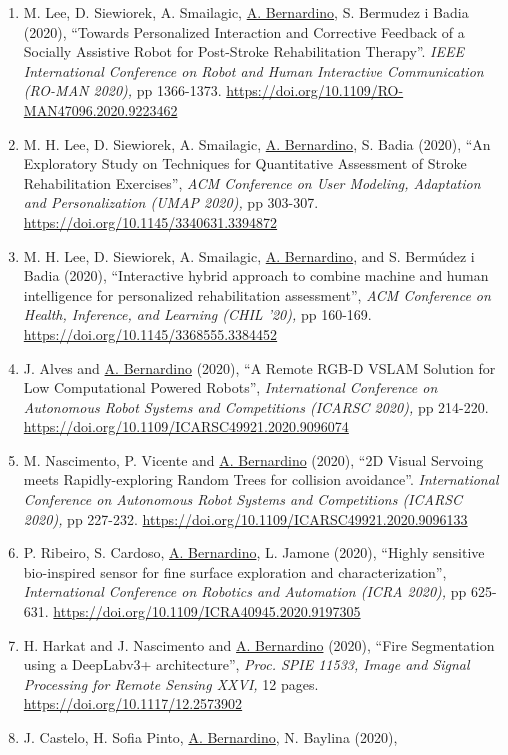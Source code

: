 \begin{enumerate}
\item
  M. Lee, D. Siewiorek, A. Smailagic, \ul{A. Bernardino}, S. Bermudez i
  Badia (2020), ``Towards Personalized Interaction and Corrective
  Feedback of a Socially Assistive Robot for Post-Stroke Rehabilitation
  Therapy''. \emph{IEEE International Conference on Robot and Human
  Interactive Communication (RO-MAN 2020),} pp 1366-1373.
  \url{https://doi.org/10.1109/RO-MAN47096.2020.9223462}~
\item
  M. H. Lee, D. Siewiorek, A. Smailagic, \ul{A. Bernardino}, S. Badia
  (2020), ``An Exploratory Study on Techniques for Quantitative
  Assessment of Stroke Rehabilitation Exercises'', \emph{ACM Conference
  on User Modeling, Adaptation and Personalization (UMAP 2020),} pp
  303-307. \url{https://doi.org/10.1145/3340631.3394872}~
\item
  M. H. Lee, D. Siewiorek, A. Smailagic, \ul{A. Bernardino}, and S.
  Bermúdez i Badia (2020), ``Interactive hybrid approach to combine
  machine and human intelligence for personalized rehabilitation
  assessment'', \emph{ACM Conference on Health, Inference, and Learning
  (CHIL '20),} pp 160-169.
  \url{https://doi.org/10.1145/3368555.3384452}~
\item
  J. Alves and \ul{A. Bernardino} (2020), ``A Remote RGB-D VSLAM
  Solution for Low Computational Powered Robots'', \emph{International
  Conference on Autonomous Robot Systems and Competitions (ICARSC
  2020),} pp 214-220.
  \url{https://doi.org/10.1109/ICARSC49921.2020.9096074}~
\item
  M. Nascimento, P. Vicente and \ul{A. Bernardino} (2020), ``2D Visual
  Servoing meets Rapidly-exploring Random Trees for collision
  avoidance''. \emph{International Conference on Autonomous Robot
  Systems and Competitions (ICARSC 2020),} pp 227-232.
  \url{https://doi.org/10.1109/ICARSC49921.2020.9096133}~
\item
  P. Ribeiro, S. Cardoso, \ul{A. Bernardino}, L. Jamone (2020), ``Highly
  sensitive bio-inspired sensor for fine surface exploration and
  characterization'', \emph{International Conference on Robotics and
  Automation (ICRA 2020),} pp 625-631.
  \url{https://doi.org/10.1109/ICRA40945.2020.9197305}~
\item
  H. Harkat and J. Nascimento and \ul{A. Bernardino} (2020), ``Fire
  Segmentation using a DeepLabv3+ architecture'', \emph{Proc. SPIE
  11533, Image and Signal Processing for Remote Sensing XXVI,} 12 pages.
  \url{https://doi.org/10.1117/12.2573902}~
\item
  J. Castelo, H. Sofia Pinto, \ul{A. Bernardino}, N. Baylina (2020),

\end{enumerate}
